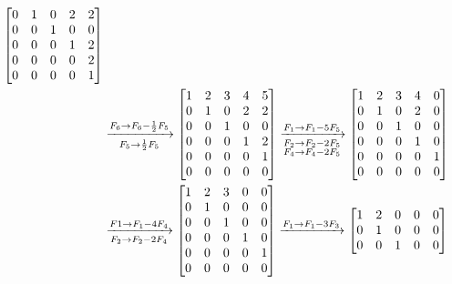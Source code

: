 \begin{enumerate}[label=\color{red}\textbf{\arabic*)}]
\begin{enumerate}[label=Paso \arabic*:]
\[\begin{aligned}
\begin{bmatrix}
            0 & 1 & 0 & 2 & 2\\
            0 & 0 & 1 & 0 & 0\\
            0 & 0 & 0 & 1 & 2\\
            0 & 0 & 0 & 0 & 2\\
            0 & 0 & 0 & 0 & 1
        \end{bmatrix}\\
& \xrightarrow[F_5\to \frac{1}{2} F_5]{F_6\to F_6-\frac{1}{2} F_5}\begin{bmatrix} 
            1 & 2 & 3 & 4 & 5\\
            0 & 1 & 0 & 2 & 2\\
            0 & 0 & 1 & 0 & 0\\
            0 & 0 & 0 & 1 & 2\\
            0 & 0 & 0 & 0 & 1\\
            0 & 0 & 0 & 0 & 0
        \end{bmatrix}\xrightarrow[\begin{subarray}{l}
F_2\to F_2-2F_5\\
F_4\to F_4-2F_5
\end{subarray}]{F_1\to F_1-5F_5}\begin{bmatrix} 
            1 & 2 & 3 & 4 & 0\\
            0 & 1 & 0 & 2 & 0\\
            0 & 0 & 1 & 0 & 0\\
            0 & 0 & 0 & 1 & 0\\
            0 & 0 & 0 & 0 & 1\\
            0 & 0 & 0 & 0 & 0
        \end{bmatrix}\\
& \xrightarrow[F_2\to F_2-2F_4]{F1\to F_1-4F_4}\begin{bmatrix} 
            1 & 2 & 3 & 0 & 0\\
            0 & 1 & 0 & 0 & 0\\
            0 & 0 & 1 & 0 & 0\\
            0 & 0 & 0 & 1 & 0\\
            0 & 0 & 0 & 0 & 1\\
            0 & 0 & 0 & 0 & 0
        \end{bmatrix}\xrightarrow{F_1\to F_1-3F_3}\begin{bmatrix} 
            1 & 2 & 0 & 0 & 0\\
            0 & 1 & 0 & 0 & 0\\
            0 & 0 & 1 & 0 & 0\\

\end{bmatrix}
\end{aligned}\]
\end{enumerate}
\end{enumerate}
